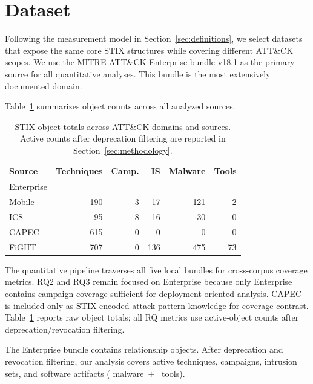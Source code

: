 \documentclass[sigconf]{acmart}
\newcommand{\mitre}{MITRE\xspace}
\newcommand{\attack}{ATT\&CK\xspace}
\begin{document}
\section{Dataset}\label{sec:dataset}

Following the measurement model in Section~\ref{sec:definitions}, we select datasets that expose the same core STIX structures while covering different ATT\&CK scopes. We use the \mitre{} \attack{} Enterprise bundle v18.1 as the primary source for all quantitative analyses. This bundle is the most extensively documented domain.

Table~\ref{tab:dataset} summarizes object counts across all analyzed sources.

\begin{table}[!htb]
\caption{STIX object totals across ATT\&CK domains and sources. Active counts after deprecation filtering are reported in Section~\ref{sec:methodology}.}\label{tab:dataset}
\centering\small
\begin{tabular}{lrrrrr}
\toprule
\textbf{Source} &
\textbf{Techniques} &
\textbf{Camp.} &
\textbf{IS} &
\textbf{Malware} &
\textbf{Tools} \\
\midrule
Enterprise & \enterprisetotalattackpatterncount{} & \enterpriseactivecampaigncount{}  & \enterprisetotalintrusionsetcount{} & \enterprisetotalmalwarecount{} & \enterprisetotaltoolcount{} \\
Mobile     & 190 & 3   & 17  & 121 & 2  \\
ICS        & 95  & 8   & 16  & 30  & 0  \\
CAPEC      & 615 & 0   & 0   & 0   & 0 \\
FiGHT      & 707 & 0   & 136 & 475 & 73 \\
\bottomrule
\end{tabular}
\end{table}

The quantitative pipeline traverses all five local bundles for cross-corpus coverage metrics. RQ2 and RQ3 remain focused on Enterprise because only Enterprise contains campaign coverage sufficient for deployment-oriented analysis. CAPEC is included only as STIX-encoded attack-pattern knowledge for coverage contrast. Table~\ref{tab:dataset} reports raw object totals; all RQ metrics use active-object counts after deprecation/revocation filtering.

The Enterprise bundle contains \enterprisetotalrelationshipcount{} relationship objects. After deprecation and revocation filtering, our analysis covers \enterpriseplatformcount{} active techniques, \enterpriseactivecampaigncount{} campaigns, \enterpriseactiveintrusionsetcount{} intrusion sets, and \enterpriseactivesoftwarecount{} software artifacts (\enterpriseactivemalwarecount{} malware~$+$~\enterpriseactivetoolcount{} tools).
\end{document}

